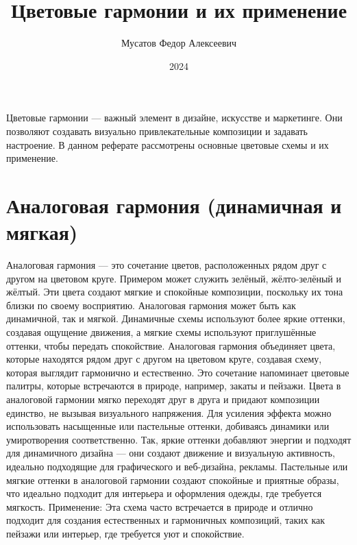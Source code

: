 \documentclass[bachelor, och, referat]{SCWorks}
\begin{document}

\title{Цветовые гармонии и их применение}




\author{Мусатов Федор Алексеевич}



\date{2024}

\maketitle

\tableofcontents

\newpage

\intro
Цветовые гармонии — важный элемент в дизайне, искусстве и маркетинге. Они позволяют создавать визуально привлекательные композиции и задавать настроение. В данном реферате рассмотрены основные цветовые схемы и их применение.

\section{Аналоговая гармония (динамичная и мягкая)}
Аналоговая гармония — это сочетание цветов, расположенных рядом друг с другом на цветовом круге. Примером может служить зелёный, жёлто-зелёный и жёлтый. Эти цвета создают мягкие и спокойные композиции, поскольку их тона близки по своему восприятию. Аналоговая гармония может быть как динамичной, так и мягкой. Динамичные схемы используют более яркие оттенки, создавая ощущение движения, а мягкие схемы используют приглушённые оттенки, чтобы передать спокойствие.
Аналоговая гармония объединяет цвета, которые находятся рядом друг с другом на цветовом круге, создавая схему, которая выглядит гармонично и естественно. Это сочетание напоминает цветовые палитры, которые встречаются в природе, например, закаты и пейзажи. Цвета в аналоговой гармонии мягко переходят друг в друга и придают композиции единство, не вызывая визуального напряжения.
Для усиления эффекта можно использовать насыщенные или пастельные оттенки, добиваясь динамики или умиротворения соответственно. Так, яркие оттенки добавляют энергии и подходят для динамичного дизайна — они создают движение и визуальную активность, идеально подходящие для графического и веб-дизайна, рекламы. Пастельные или мягкие оттенки в аналоговой гармонии создают спокойные и приятные образы, что идеально подходит для интерьера и оформления одежды, где требуется мягкость.
Применение: Эта схема часто встречается в природе и отлично подходит для создания естественных и гармоничных композиций, таких как пейзажи или интерьер, где требуется уют и спокойствие.
\end{document}
